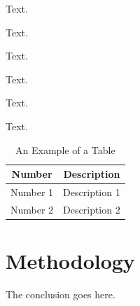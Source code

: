 \documentclass[conference]{IEEEtran}
\begin{document}
Text.

Text.

Text.

Text.

Text.

Text.


%
\begin{table}[!tp]
\caption{An Example of a Table}
\label{table_example}
\centering
\begin{tabular}{c|c}
\hline
\textbf{Number} & \textbf{Description} \\
\hline
Number 1 & Description 1 \\
\hline
Number 2 & Description 2\\
\hline
\end{tabular}
\end{table}






\section{Methodology}
The conclusion goes here.
\end{document}
